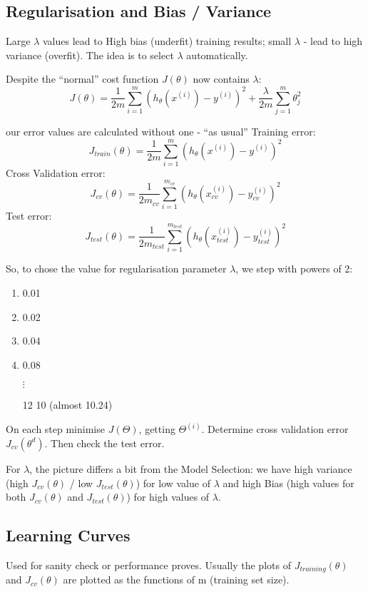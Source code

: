 \documentclass{scrartcl}
\begin{document}
\subsection{Regularisation and Bias / Variance}
\label{sec:10-5}

Large $\lambda$ values lead to High bias (underfit) training results;
small $\lambda$ - lead to high variance (overfit). The idea is to
select $\lambda$ automatically.

Despite the ``normal'' cost function $J(\theta)$ now contains
$\lambda$:
\[J(\theta) = \frac{1}{2m} \sum \limits_{i=1}^{m}(h_\theta(x^{(i)}) -
y^{(i)})^2 + \frac{\lambda}{2m} \sum \limits_{j=1}^{m} \theta_j^2  \]

our error values are calculated without one - ``as usual''
Training error:
\[ J_{train}(\theta) = \frac{1}{2m} \sum
\limits_{i=1}^{m}(h_\theta(x^{(i)}) - y^{(i)})^2 \]
Cross Validation error:
\[ J_{cv}(\theta) = \frac{1}{2m_{cv}} \sum
\limits_{i=1}^{m_{cv}}(h_\theta(x_{cv}^{(i)}) - y_{cv}^{(i)})^2 \]
Test error:
\[ J_{test}(\theta) = \frac{1}{2m_{test}} \sum
\limits_{i=1}^{m_{test}}(h_\theta(x_{test}^{(i)}) - y_{test}^{(i)})^2 \]

So, to chose the value for regularisation parameter $\lambda$, we step
with powers of 2:
\begin{enumerate}
\item 0.01
\item 0.02
\item 0.04
\item 0.08

$\vdots$
\item[12] 10 (almost 10.24)
\end{enumerate}

On each step minimise $J(\Theta)$, getting $\Theta^{(i)}$. Determine
cross validation error $J_{cv}(\theta^{d})$. Then check the test
error.

For $\lambda$, the picture differs a bit from the Model Selection: we
have high variance (high $J_{cv}(\theta)$ / low $J_{test}(\theta)$)
for low value of $\lambda$ and high Bias (high values for both
$J_{cv}(\theta)$ and $J_{test}(\theta)$) for high values of $\lambda$.

\subsection{Learning Curves}
\label{sec:10-6}

Used for sanity check or performance proves. Usually the plots of
$J_{training}(\theta)$ and $J_{cv}(\theta)$ are plotted as the
functions of m (training set size).
\end{document}
